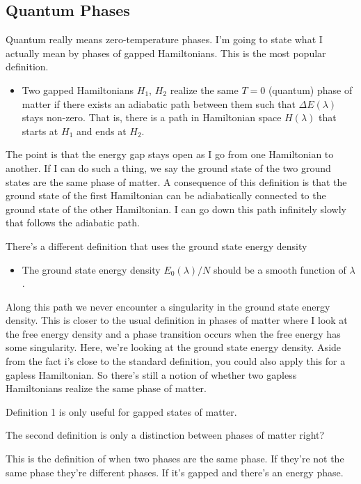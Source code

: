 \subsection{Quantum Phases}
Quantum really means zero-temperature phases.
I'm going to state what I actually mean by phases of gapped Hamiltonians.
This is the most popular definition.

\begin{itemize}
    \item Two gapped Hamiltonians $H_1$, $H_2$ realize the same $T=0$ (quantum)
        phase of matter if there exists an adiabatic path between them
        such that $\Delta E(\lambda)$ stays non-zero.
        That is, there is a path in Hamiltonian space $H(\lambda)$
        that starts at $H_1$ and ends at $H_2$.
\end{itemize}
The point is that the energy gap stays open as I go from one Hamiltonian to
another.
If I can do such a thing, we say the ground state of the two ground states are
the same phase of matter.
A consequence of this definition is that the ground state of the first
Hamiltonian can be adiabatically connected to the ground state of the other
Hamiltonian.
I can go down this path infinitely slowly that follows the adiabatic path.

There's a different definition that uses the ground state energy density
\begin{itemize}
    \item The ground state energy density $E_0(\lambda)/N$
        should be a smooth function of $\lambda$.
\end{itemize}
Along this path we never encounter a singularity in the ground state energy
density.
This is closer to the usual definition in phases of matter
where I look at the free energy density and a phase transition occurs when the
free energy has some singularity.
Here, we're looking at the ground state energy density.
Aside from the fact i's close to the standard definition,
you could also apply this for a gapless Hamiltonian.
So there's still a notion of whether two gapless Hamiltonians realize the same
phase of matter.

Definition 1 is only useful for gapped states of matter.

\begin{question}
    The second definition is only a distinction between phases of matter right?
\end{question}
This is the definition of when two phases are the same phase.
If they're not the same phase they're different phases.
If it's gapped and there's an energy phase.

